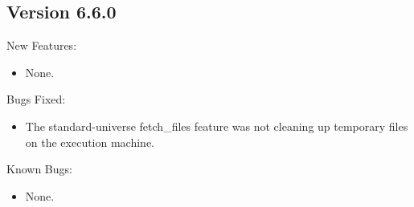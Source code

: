 \subsection{\label{sec:New-6-6-0}Version 6.6.0}

\noindent New Features:

\begin{itemize}

\item None.

\end{itemize}

\noindent Bugs Fixed:

\begin{itemize}

\item The standard-universe fetch_files feature was not cleaning up
temporary files on the execution machine.

\end{itemize}

\noindent Known Bugs:

\begin{itemize}

\item None.

\end{itemize}


